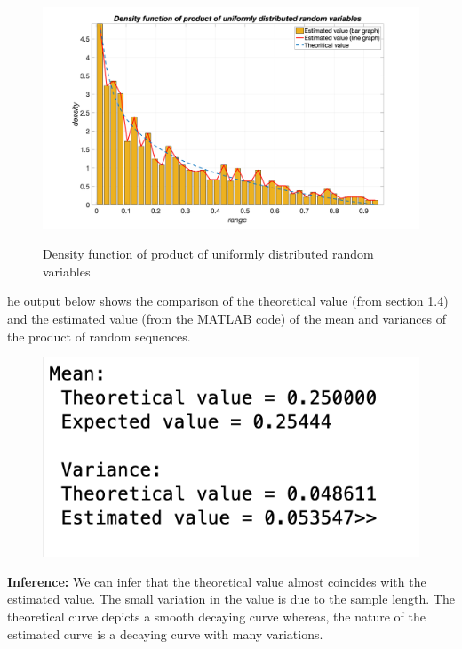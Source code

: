 \begin{figure}[H]
\centering
{\includegraphics[scale=0.16]{ass4_1.png}}
\caption{Density function of product of uniformly distributed random variables}
\label{Density function of product of uniformly distributed random variables}
\end{figure}

\noindent he output below shows the comparison of the theoretical value (from section 1.4) and the estimated value (from the MATLAB code) of the mean and variances of the product of random sequences.

\begin{figure}[H]
\centering
{\includegraphics[scale=0.63]{ass4_2.png}}
\end{figure}

\noindent \textbf{Inference:} We can infer that the theoretical value almost coincides with the estimated value. The small variation in the value is due to the sample length. The theoretical curve depicts a smooth decaying curve whereas, the nature of the estimated curve is a decaying curve with many variations.


